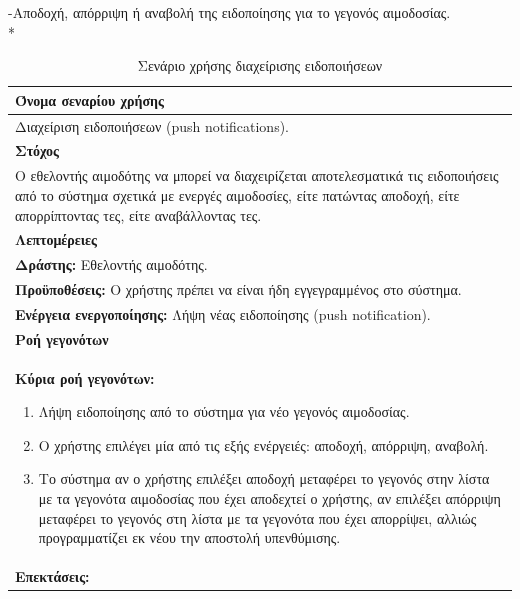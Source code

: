 \newpage
-Αποδοχή, απόρριψη ή αναβολή της ειδοποίησης για το γεγονός αιμοδοσίας.
\\*
\begin{table}[H]
	\begin{center}
	    \begin{tabular}{|p{\dimexpr \linewidth-2\tabcolsep}|}
	    \hline
	    \rowcolor{grayy}
	    \textbf{Όνομα σεναρίου χρήσης}
	    \\ \hline    
	     Διαχείριση ειδοποιήσεων (push notifications).
	     \\ \hline
	    \rowcolor{grayy}
	    \textbf{\textbf{Στόχος}}
	    \\ \hline
	 	 Ο εθελοντής αιμοδότης να μπορεί να διαχειρίζεται αποτελεσματικά τις ειδοποιήσεις από το σύστημα σχετικά με ενεργές αιμοδοσίες, είτε πατώντας αποδοχή,  είτε απορρίπτοντας τες, είτε αναβάλλοντας τες.
	    \\ \hline
	    \rowcolor{grayy}
	    \textbf{Λεπτομέρειες}
	    \\ \hline
		\textbf{Δράστης:} Εθελοντής αιμοδότης.
		\\*
		\textbf{Προϋποθέσεις:} Ο χρήστης πρέπει να είναι ήδη εγγεγραμμένος στο σύστημα.
		\\*
		\textbf{Ενέργεια ενεργοποίησης:} Λήψη νέας ειδοποίησης (push notification).
		\\ \hline
		\rowcolor{grayy}    
	    \textbf{Ροή γεγονότων}
	    \\ \hline
		\textbf{Κύρια ροή γεγονότων:}
		\begin{enumerate}
		
			\item	Λήψη ειδοποίησης από το σύστημα για νέο γεγονός αιμοδοσίας.
			\item  Ο χρήστης επιλέγει μία από τις εξής ενέργειές: αποδοχή, απόρριψη, αναβολή.
			\item Το σύστημα αν ο χρήστης επιλέξει αποδοχή μεταφέρει το γεγονός στην λίστα με τα γεγονότα αιμοδοσίας που έχει αποδεχτεί ο χρήστης, αν επιλέξει απόρριψη μεταφέρει το γεγονός στη λίστα με τα γεγονότα που έχει απορρίψει, αλλιώς προγραμματίζει εκ νέου την αποστολή υπενθύμισης.

		\end{enumerate}
		\\ \hline
		\rowcolor{grayy}
		\textbf{Επεκτάσεις:}
		   \\ \hline
	    \end{tabular}
	    \caption{Σενάριο χρήσης διαχείρισης ειδοποιήσεων}
	    \label{tab:manage_notifcations} 
	\end{center}		
\end{table}			
			
